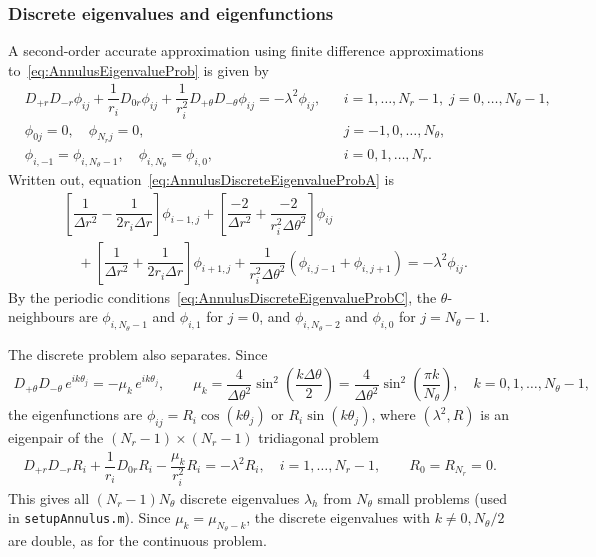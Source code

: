 \documentclass[11pt]{article}
\begin{document}
\subsubsection{Discrete eigenvalues and eigenfunctions}
A second-order accurate approximation using finite difference approximations to~\eqref{eq:AnnulusEigenvalueProb} is given by
\begin{subequations}
\label{eq:AnnulusDiscreteEigenvalueProb}
\begin{align}
& D_{+r}D_{-r}\phi_{ij}+\dfrac{1}{r_i}D_{0r}\phi_{ij}+\dfrac{1}{r_i^2}D_{+\theta}D_{-\theta}\phi_{ij}=-\lambda^2 \phi_{ij}, && i=1,\dots,N_r-1,\; j=0,\dots,N_\theta-1, \label{eq:AnnulusDiscreteEigenvalueProbA}\\
& \phi_{0j}=0,\quad \phi_{N_r j}=0, && j=-1,0,\dots,N_\theta, \label{eq:AnnulusDiscreteEigenvalueProbB}\\
& \phi_{i,-1}=\phi_{i,N_\theta-1},\quad \phi_{i,N_\theta}=\phi_{i,0}, && i=0,1,\dots,N_r. \label{eq:AnnulusDiscreteEigenvalueProbC}
\end{align}
\end{subequations}
Written out, equation~\eqref{eq:AnnulusDiscreteEigenvalueProbA} is
\begin{align*}
&\left[\dfrac{1}{\Delta r^2}-\dfrac{1}{2r_i\Delta r}\right]\phi_{i-1,j}+\left[\dfrac{-2}{\Delta r^2}+\dfrac{-2}{r_i^2\Delta \theta^2}\right]\phi_{ij}\\
&\quad+\left[\dfrac{1}{\Delta r^2}+\dfrac{1}{2r_i\Delta r}\right]\phi_{i+1,j}+\dfrac{1}{r_i^2 \Delta\theta^2}\left(\phi_{i,j-1}+\phi_{i,j+1}\right)=-\lambda^2\phi_{ij}.
\end{align*}
By the periodic conditions~\eqref{eq:AnnulusDiscreteEigenvalueProbC}, the $\theta$-neighbours are $\phi_{i,N_\theta-1}$ and $\phi_{i,1}$ for $j=0$, and $\phi_{i,N_\theta-2}$ and $\phi_{i,0}$ for $j=N_\theta-1$.

The discrete problem also separates. Since
\begin{align}
D_{+\theta}D_{-\theta}\, e^{ik\theta_j} = -\mu_k\, e^{ik\theta_j}, \qquad \mu_k=\dfrac{4}{\Delta\theta^2}\sin^2\left(\dfrac{k\Delta\theta}{2}\right)=\dfrac{4}{\Delta\theta^2}\sin^2\left(\dfrac{\pi k}{N_\theta}\right), \quad k=0,1,\dots,N_\theta-1,
\end{align}
the eigenfunctions are $\phi_{ij}=R_i\cos(k\theta_j)$ or $R_i\sin(k\theta_j)$, where $(\lambda^2, R)$ is an eigenpair of the $(N_r-1)\times(N_r-1)$ tridiagonal problem
\begin{align}
D_{+r}D_{-r}R_i+\dfrac{1}{r_i}D_{0r}R_i-\dfrac{\mu_k}{r_i^2}R_i=-\lambda^2 R_i, \quad i=1,\dots,N_r-1, \qquad R_0=R_{N_r}=0.
\end{align}
This gives all $(N_r-1)N_\theta$ discrete eigenvalues $\lambda_h$ from $N_\theta$ small problems (used in \texttt{setupAnnulus.m}). Since $\mu_k=\mu_{N_\theta-k}$, the discrete eigenvalues with $k\neq 0, N_\theta/2$ are double, as for the continuous problem.
\end{document}
